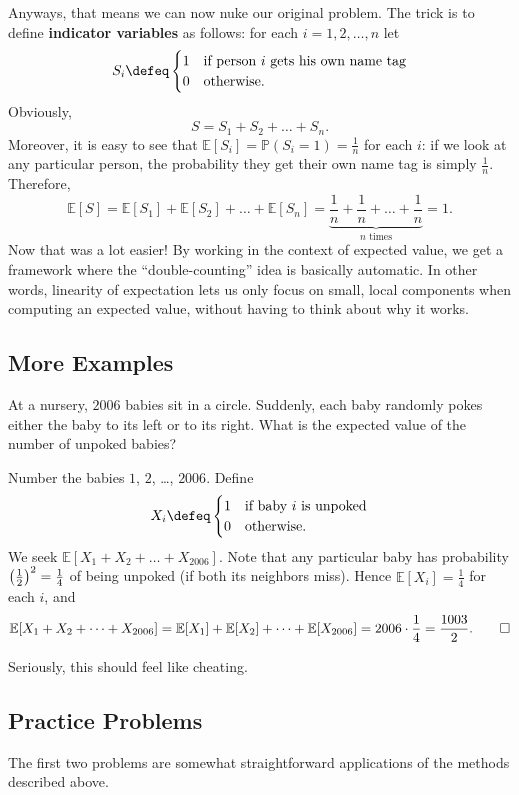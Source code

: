 \documentclass[11pt]{scrartcl}
\newcommand\EE{\mathbb E}
\newcommand\PP{\mathbb P}
\begin{document}
Anyways, that means we can now nuke our original problem.
The trick is to define \textbf{indicator variables} as follows: for each $i=1,2,\dots,n$ let
\[
  S_i \defeq
  \begin{cases}
    1 & \text{if person $i$ gets his own name tag} \\
    0 & \text{otherwise}.
  \end{cases}
  \]
Obviously, \[ S = S_1 + S_2 + \dots + S_n. \]
Moreover, it is easy to see that $\EE[S_i] = \PP(S_i = 1) =  \frac 1n$ for each $i$:
if we look at any particular person, the probability they get their own name tag is
simply $\frac 1n$.
Therefore,
\[ \EE[S] = \EE[S_1] + \EE[S_2] + \dots + \EE[S_n]
  = \underbrace{\frac1n + \frac1n + \dots + \frac 1n}_{\text{$n$ times}}
  = 1. \]
Now that was a lot easier!
By working in the context of expected value, we get a framework
where the ``double-counting'' idea is basically automatic.
In other words, linearity of expectation lets us only focus on small, local components
when computing an expected value, without having to think about why it works.

\subsection{More Examples}
\begin{example}
  [HMMT 2006] At a nursery, $2006$ babies sit in a circle.
  Suddenly, each baby randomly pokes either the baby to its left or to its right.
  What is the expected value of the number of unpoked babies?
\end{example}
\begin{soln}
  Number the babies $1$, $2$, \dots, $2006$.  Define
  \[
    X_i \defeq
    \begin{cases}
      1 & \text{if baby $i$ is unpoked} \\
      0 & \text{otherwise}.
    \end{cases}
  \]
  We seek $\EE[X_1 + X_2 + \dots + X_{2006}]$.
  Note that any particular baby has probability
  $\left( \frac{1}{2} \right)^2 = \frac 14$ of being unpoked (if both its neighbors miss).
  Hence $\EE[X_i] = \frac 14$ for each $i$, and
  \[ \EE[X_1 + X_2 + \dots + X_{2006}]
  = \EE[X_1] + \EE[X_2] + \dots + \EE[X_{2006}]
  = 2006 \cdot \frac 14
  = \frac{1003}{2}. \qedhere \]
\end{soln}
Seriously, this should feel like cheating.

\subsection{Practice Problems}
The first two problems are somewhat straightforward applications of the methods described above.
\end{document}
